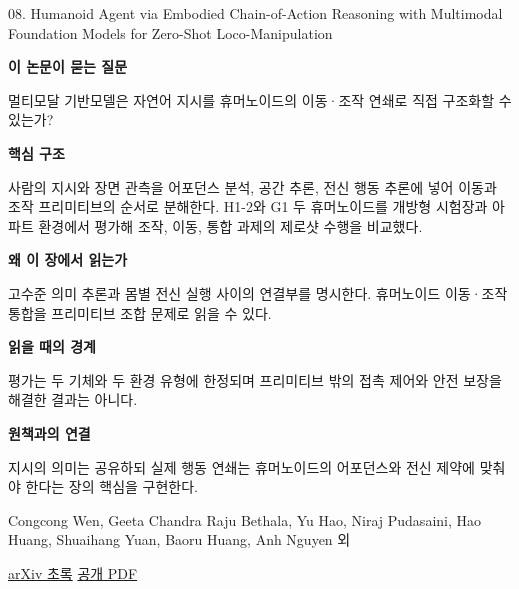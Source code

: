 \documentclass[11pt,openany]{book}
\begin{document}
\begin{termcard}{08. Humanoid Agent via Embodied Chain-of-Action Reasoning with Multimodal Foundation Models for Zero-Shot Loco-Manipulation}

\par

\medskip

{\sffamily\bfseries\color{deepblue} 이 논문이 묻는 질문}\par

멀티모달 기반모델은 자연어 지시를 휴머노이드의 이동·조작 연쇄로 직접 구조화할 수 있는가?

\smallskip

{\sffamily\bfseries\color{deepblue} 핵심 구조}\par

사람의 지시와 장면 관측을 어포던스 분석, 공간 추론, 전신 행동 추론에 넣어 이동과 조작 프리미티브의 순서로 분해한다. H1-2와 G1 두 휴머노이드를 개방형 시험장과 아파트 환경에서 평가해 조작, 이동, 통합 과제의 제로샷 수행을 비교했다.

\smallskip

{\sffamily\bfseries\color{deepblue} 왜 이 장에서 읽는가}\par

고수준 의미 추론과 몸별 전신 실행 사이의 연결부를 명시한다. 휴머노이드 이동·조작 통합을 프리미티브 조합 문제로 읽을 수 있다.

\smallskip

{\sffamily\bfseries\color{coral} 읽을 때의 경계}\par

평가는 두 기체와 두 환경 유형에 한정되며 프리미티브 밖의 접촉 제어와 안전 보장을 해결한 결과는 아니다.

\smallskip

{\sffamily\bfseries\color{teal} 원책과의 연결}\par

지시의 의미는 공유하되 실제 행동 연쇄는 휴머노이드의 어포던스와 전신 제약에 맞춰야 한다는 장의 핵심을 구현한다.

\medskip

{\footnotesize\color{muted} Congcong Wen, Geeta Chandra Raju Bethala, Yu Hao, Niraj Pudasaini, Hao Huang, Shuaihang Yuan, Baoru Huang, Anh Nguyen 외\par

\href{https://arxiv.org/abs/2504.09532}{arXiv 초록} \quad \href{https://arxiv.org/pdf/2504.09532}{공개 PDF}\par}

\end{termcard}
\end{document}
